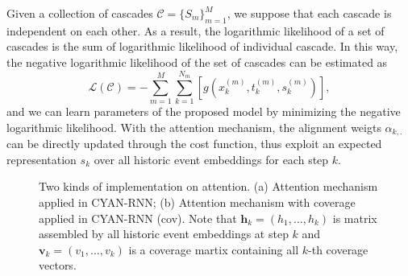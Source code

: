 Given a collection of cascades $\mathcal{C}=\{S_m\}_{m=1}^M$, we suppose that
each cascade is independent on each other. As a result, the logarithmic
likelihood of a set of cascades is the sum of logarithmic likelihood of individual cascade.
In this way, the negative logarithmic likelihood of the set of cascades can be
estimated as
\begin{equation}
\mathcal{L}(\mathcal{C})=-\sum_{m=1}^M \sum_{k=1}^{N_m} \left[
g(x_k^{(m)}, t_{k}^{(m)}, s_{k}^{(m)}) \right], 
\end{equation}
and we can learn parameters of the proposed model by minimizing the negative
logarithmic likelihood.
With the attention mechanism, the alignment
weigts $\alpha_{k,.}$ can be directly updated through the cost function, thus
exploit an expected representation $s_k$ over all historic event embeddings for
each step $k$.


 
\begin{figure}[ht!]
\centering
{}
\caption{Two kinds of implementation on attention. (a) Attention mechanism
applied in CYAN-RNN; (b) Attention mechanism with coverage applied in CYAN-RNN
(cov). Note that $\textbf{h}_k=(h_1,\ldots,h_k)$ is matrix assembled by all
historic event embeddings at step $k$ and $\textbf{v}_k=(v_1,\ldots,v_k)$ is
a coverage martix containing all $k$-th coverage vectors.}
\end{figure}

